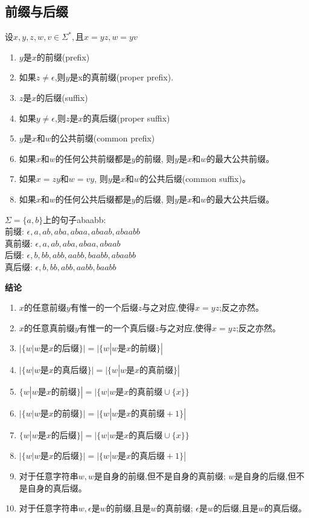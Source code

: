 \subsection{前缀与后缀}
设$x,y,z,w,v\in \Sigma^{\ast},$且$x=yz,w=yv$
\begin{enumerate}
	\item $y$是$x$的前缀(prefix)
	\item 如果$z\ne \epsilon$,则$y$是x的真前缀(proper prefix).
	\item $z$是$x$的后缀(suffix)
	\item 如果$y\ne \epsilon$,则$z$是$x$的真后缀(proper suffix)
	\item $y$是$x$和$w$的公共前缀(common prefix)
	\item 如果$x$和$w$的任何公共前缀都是$y$的前缀, 则$y$是$x$和$w$的最大公共前缀。
	\item 如果$x=zy$和$w=vy$, 则$y$是$x$和$w$的公共后缀(common suffix)。
	\item 如果$x$和$w$的任何公共后缀都是$y$的后缀, 则$y$是$x$和$w$的最大公共后缀。
\end{enumerate}

\begin{example}
	$\Sigma = \{a,b\}$上的句子abaabb:\\
	前缀: $\epsilon,a,ab,aba,abaa,abaab,abaabb$ \\
	真前缀: $\epsilon,a,ab,aba,abaa,abaab$ \\
	后缀: $\epsilon,b,bb,abb,aabb,baabb,abaabb$ \\
	真后缀: $\epsilon,b,bb,abb,aabb,baabb$
\end{example}

\noindent \textbf{结论}

\begin{enumerate}
	\item $x$的任意前缀$y$有惟一的一个后缀$z$与之对应,使得$x=yz$;反之亦然。
	\item $x$的任意真前缀$y$有惟一的一个真后缀$z$与之对应,使得$x=yz$;反之亦然。
	\item $|\{w|w\text{是}x\text{的后缀}\}| = |\{w|w\text{是}x\text{的前缀}\}|$
	\item $|\{w|w\text{是}x\text{的真后缀}\}| = |\{w|w\text{是}x\text{的真前缀}\}|$
	\item $\{w|w\text{是}x\text{的前缀}\}| = |\{w|w\text{是}x\text{的真前缀}\cup \{x\}\}$
	\item $|\{w|w\text{是}x\text{的前缀}\}| = |\{w|w\text{是}x\text{的真前缀} + 1\}|$
	\item $\{w|w\text{是}x\text{的后缀}\}| = |\{w|w\text{是}x\text{的真后缀}\cup \{x\}\}$
	\item $|\{w|w\text{是}x\text{的后缀}\}| = |\{w|w\text{是}x\text{的真后缀} + 1\}|$
	\item 对于任意字符串$w,w$是自身的前缀,但不是自身的真前缀; $w$是自身的后缀,但不是自身的真后缀。
	\item 对于任意字符串$w,\epsilon$是$w$的前缀,且是$w$的真前缀; $\epsilon$是$w$的后缀,且是$w$的真后缀。
\end{enumerate}

